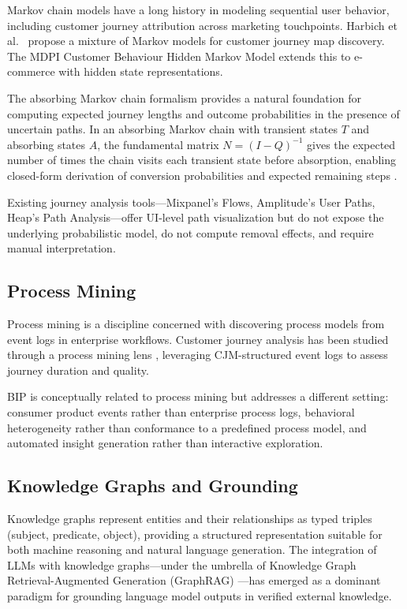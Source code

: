 \documentclass[12pt, a4paper]{article}
\begin{document}
Markov chain models have a long history in modeling sequential user behavior, including customer journey attribution across marketing touchpoints. Harbich et al.\ \cite{harbich2017} propose a mixture of Markov models for customer journey map discovery. The MDPI Customer Behaviour Hidden Markov Model \cite{wang2022} extends this to e-commerce with hidden state representations.

The absorbing Markov chain formalism provides a natural foundation for computing expected journey lengths and outcome probabilities in the presence of uncertain paths. In an absorbing Markov chain with transient states $T$ and absorbing states $A$, the fundamental matrix $N = (I - Q)^{-1}$ gives the expected number of times the chain visits each transient state before absorption, enabling closed-form derivation of conversion probabilities and expected remaining steps \cite{kemeny1960}.

Existing journey analysis tools---Mixpanel's Flows, Amplitude's User Paths, Heap's Path Analysis---offer UI-level path visualization but do not expose the underlying probabilistic model, do not compute removal effects, and require manual interpretation.

\subsection{Process Mining}

Process mining \cite{vanderaalst2016} is a discipline concerned with discovering process models from event logs in enterprise workflows. Customer journey analysis has been studied through a process mining lens \cite{bernard2017}, leveraging CJM-structured event logs to assess journey duration and quality.

BIP is conceptually related to process mining but addresses a different setting: consumer product events rather than enterprise process logs, behavioral heterogeneity rather than conformance to a predefined process model, and automated insight generation rather than interactive exploration.

\subsection{Knowledge Graphs and Grounding}

Knowledge graphs represent entities and their relationships as typed triples (subject, predicate, object), providing a structured representation suitable for both machine reasoning and natural language generation. The integration of LLMs with knowledge graphs---under the umbrella of Knowledge Graph Retrieval-Augmented Generation (GraphRAG) \cite{li2024,zhang2025}---has emerged as a dominant paradigm for grounding language model outputs in verified external knowledge.
\end{document}
